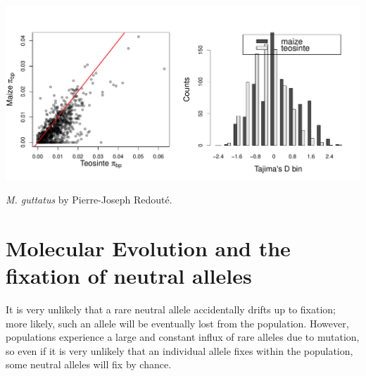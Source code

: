 \begin{marginfigure}
\begin{center}
  \includegraphics[width = 0.5 \textwidth]{Journal_figs/genetic_drift/human_pop_growth/Wright_Tajima_D.pdf}
\end{center}
\caption{{\it M. guttatus} by Pierre-Joseph
  Redout\'e.} \label{fig:Human_growth}  %
\end{marginfigure}



\section{Molecular Evolution and the fixation of neutral alleles} 
It is very unlikely that a rare
neutral allele accidentally drifts up to fixation; more likely, such an allele
will be eventually lost from the population. However, populations experience a
large and constant influx of rare alleles due to mutation, so even if it is
very unlikely that an individual allele fixes within the population, some
neutral alleles will fix by chance.  \\




